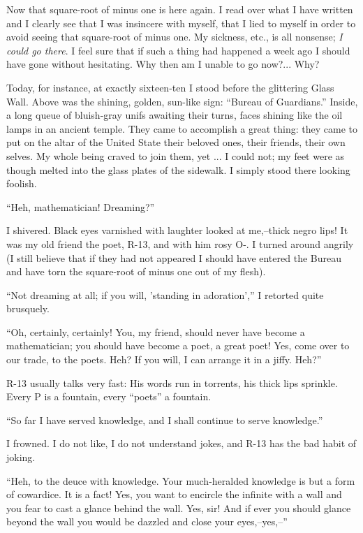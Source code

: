 \documentclass[11pt,openany]{book}
\begin{document}
Now that square-root of minus one is here again. I read over what I have written and I clearly see that I was insincere with myself, that I lied to myself in order to avoid seeing that square-root of minus one. My sickness, etc., is all nonsense; \emph{I could go there}. I feel sure that if such a thing had happened a week ago I should have gone without hesitating. Why then am I unable to go now?... Why?

Today, for instance, at exactly sixteen-ten I stood before the glittering Glass Wall. Above was the shining, golden, sun-like sign: ``Bureau of Guardians.'' Inside, a long queue of bluish-gray unifs awaiting their turns, faces shining like the oil lamps in an ancient temple. They came to accomplish a great thing: they came to put on the altar of the United State their beloved ones, their friends, their own selves. My whole being craved to join them, yet ... I could not; my feet were as though melted into the glass plates of the sidewalk. I simply stood there looking foolish.

``Heh, mathematician! Dreaming?''

I shivered. Black eyes varnished with laughter looked at me,--thick negro lips! It was my old friend the poet, R-13, and with him rosy O-. I turned around angrily (I still believe that if they had not appeared I should have entered the Bureau and have torn the square-root of minus one out of my flesh).

``Not dreaming at all; if you will, 'standing in adoration','' I retorted quite brusquely.

``Oh, certainly, certainly! You, my friend, should never have become a mathematician; you should have become a poet, a great poet! Yes, come over to our trade, to the poets. Heh? If you will, I can arrange it in a jiffy. Heh?''

R-13 usually talks very fast: His words run in torrents, his thick lips sprinkle. Every P is a fountain, every ``poets'' a fountain.

``So far I have served knowledge, and I shall continue to serve knowledge.''

I frowned. I do not like, I do not understand jokes, and R-13 has the bad habit of joking.

``Heh, to the deuce with knowledge. Your much-heralded knowledge is but a form of cowardice. It is a fact! Yes, you want to encircle the infinite with a wall and you fear to cast a glance behind the wall. Yes, sir! And if ever you should glance beyond the wall you would be dazzled and close your eyes,--yes,--''
\end{document}
